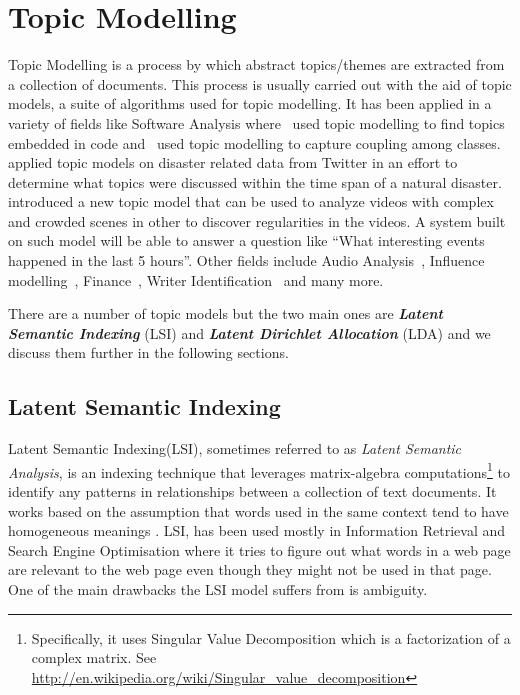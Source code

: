 \section{Topic Modelling}
\label{sec:bg_topic_modelling}
Topic Modelling is a process by which abstract topics/themes are extracted from a collection of
documents. This process is usually carried out with the aid of topic models, a suite of algorithms
used for topic modelling. It has been applied in a variety of fields like Software Analysis
where~\cite{linstead2009software} used topic modelling to find topics embedded in code
and~\cite{gethers2010using} used topic modelling to capture coupling among
classes.~\cite{kireyev2009applications} applied topic models on disaster related data from Twitter
in an effort to determine what topics were discussed within the time span of a natural
disaster.~\cite{hospedales2009markov} introduced a new topic model that can be used to analyze
videos with complex and crowded scenes in other to discover regularities in the videos. A system
built on such model will be able to answer a question like ``What interesting events happened in the
last 5 hours''. Other fields include Audio Analysis~\cite{smaragdis2009topic}, Influence
modelling~\cite{gerrish2009modeling}, Finance~\cite{doyle2009financial}, Writer
Identification~\cite{bhardwaj2009writer} and many more.

There are a number of topic models but the two main ones are \textbf{\textit{Latent Semantic
Indexing}} (LSI) and \textbf{\textit{Latent Dirichlet Allocation}} (LDA) and we discuss them further
in the following sections.


\subsection{Latent Semantic Indexing}
\label{sub:bg_lsa}
Latent Semantic Indexing(LSI), sometimes referred to as \textit{Latent Semantic Analysis}, is an
indexing technique that leverages matrix-algebra computations\footnote{Specifically, it uses Singular
Value Decomposition which is a factorization of a complex matrix. See
\url{http://en.wikipedia.org/wiki/Singular_value_decomposition}} to identify any patterns in
relationships between a collection of text documents. It works based on the assumption that words
used in the same context tend to have homogeneous meanings
\cite{deerwester1990indexing,dumais2004latent,landauer2006latent}. LSI, has been used mostly in
Information Retrieval and Search Engine Optimisation where it tries to figure out what words in a
web page are relevant to the web page even though they might not be used in that page. One of the
main drawbacks the LSI model suffers from is ambiguity.

